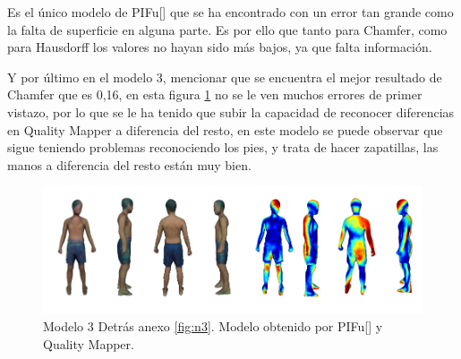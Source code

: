 Es el único modelo de PIFu[\cite{pifu}] que se ha encontrado con un error tan grande como la falta de superficie en alguna parte. Es por ello que tanto para Chamfer, como para Hausdorff los valores no hayan sido más bajos, ya que falta información.

Y por último en el modelo 3, mencionar que se encuentra el mejor resultado de Chamfer que es 0,16, en esta figura \ref{fig:nahuel} no se le ven muchos errores de primer vistazo, por lo que se le ha tenido que subir la capacidad de reconocer diferencias en Quality Mapper a diferencia del resto, en este modelo se puede observar que sigue teniendo problemas reconociendo los pies, y trata de hacer zapatillas, las manos a diferencia del resto están muy bien.

\begin{figure}[H]
	\centering
	\includegraphics[scale=0.5]{imagenes/nahuel.png}
	\caption{Modelo 3 Detrás anexo \ref{fig:n3}. Modelo obtenido por PIFu[\cite{pifu}] y Quality Mapper.}
	\label{fig:nahuel}
\end{figure}


